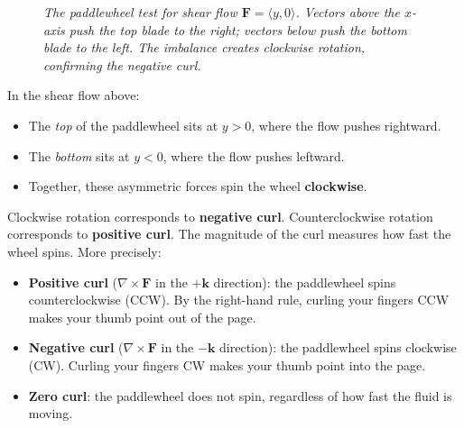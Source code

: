 \begin{figure}[H]
\centering
{}
\caption{\textit{The paddlewheel test for shear flow $\mathbf{F} = \langle y, 0 \rangle$. Vectors above the $x$-axis push the top blade to the right; vectors below push the bottom blade to the left. The imbalance creates clockwise rotation, confirming the negative curl.}}
\label{fig:paddlewheel_shear}
\end{figure}

\noindent In the shear flow above:
\begin{itemize}
    \item The \textit{top} of the paddlewheel sits at $y > 0$, where the flow pushes rightward.
    \item The \textit{bottom} sits at $y < 0$, where the flow pushes leftward.
    \item Together, these asymmetric forces spin the wheel \textbf{clockwise}.
\end{itemize}

\noindent Clockwise rotation corresponds to \textbf{negative curl}. Counterclockwise rotation corresponds to \textbf{positive curl}. The magnitude of the curl measures how fast the wheel spins. More precisely:

\begin{itemize}
    \item \textbf{Positive curl} ($\nabla \times \mathbf{F}$ in the $+\mathbf{k}$ direction): the paddlewheel spins counterclockwise (CCW). By the right-hand rule, curling your fingers CCW makes your thumb point out of the page.
    \item \textbf{Negative curl} ($\nabla \times \mathbf{F}$ in the $-\mathbf{k}$ direction): the paddlewheel spins clockwise (CW). Curling your fingers CW makes your thumb point into the page.
    \item \textbf{Zero curl}: the paddlewheel does not spin, regardless of how fast the fluid is moving.
\end{itemize}

